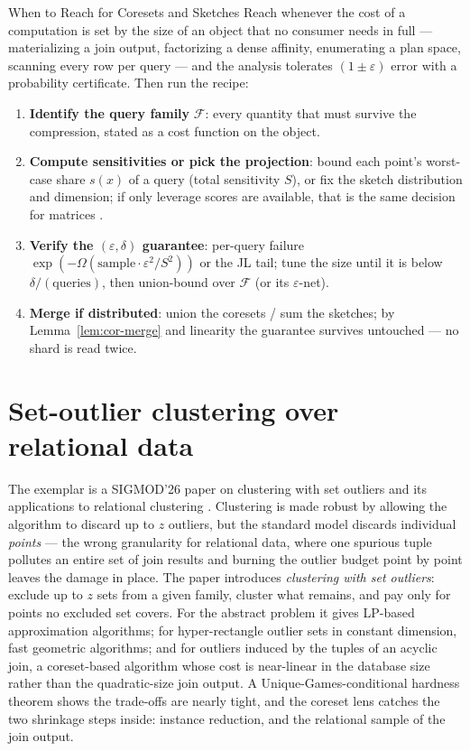 \begin{reachbox}{When to Reach for Coresets and Sketches}
Reach whenever the cost of a computation is set by the size of an object
that no consumer needs in full --- materializing a join output,
factorizing a dense affinity, enumerating a plan space, scanning every
row per query --- and the analysis tolerates $(1\pm\varepsilon)$ error
with a probability certificate. Then run the recipe:
\begin{enumerate}
\item \textbf{Identify the query family} $\mathcal{F}$: every quantity
  that must survive the compression, stated as a cost function on the
  object.
\item \textbf{Compute sensitivities or pick the projection}: bound each
  point's worst-case share $s(x)$ of a query (total sensitivity $S$),
  or fix the sketch distribution and dimension; if only leverage scores
  are available, that is the same decision for matrices
  \citep{coresets-rnla-bg8}.
\item \textbf{Verify the $(\varepsilon,\delta)$ guarantee}: per-query
  failure $\exp(-\Omega(\text{sample} \cdot \varepsilon^2/S^2))$ or the
  JL tail; tune the size until it is below
  $\delta/(\text{queries})$, then union-bound over $\mathcal{F}$ (or
  its $\varepsilon$-net).
\item \textbf{Merge if distributed}: union the coresets / sum the
  sketches; by Lemma~\ref{lem:cor-merge} and linearity the guarantee
  survives untouched --- no shard is read twice.
\end{enumerate}
\end{reachbox}

\section{Set-outlier clustering over relational data}
\label{sec:cor-soc}

The exemplar is a SIGMOD'26 paper on clustering with set outliers and
its applications to relational clustering \citep{sigmod26-289}.
Clustering is made robust by allowing the algorithm to discard up to $z$
outliers, but the standard model discards individual \emph{points} ---
the wrong granularity for relational data, where one spurious tuple
pollutes an entire set of join results and burning the outlier budget
point by point leaves the damage in place. The paper introduces
\emph{clustering with set outliers}: exclude up to $z$ sets from a given
family, cluster what remains, and pay only for points no excluded set
covers. For the abstract problem it gives LP-based approximation
algorithms; for hyper-rectangle outlier sets in constant dimension, fast
geometric algorithms; and for outliers induced by the tuples of an
acyclic join, a coreset-based algorithm whose cost is near-linear in the
database size rather than the quadratic-size join output. A
Unique-Games-conditional hardness theorem shows the trade-offs are
nearly tight, and the coreset lens catches the two shrinkage steps
inside: instance reduction, and the relational sample of the join
output.

